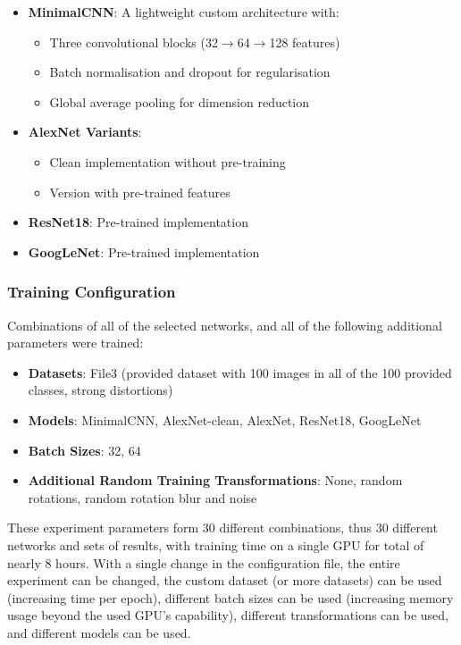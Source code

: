 \documentclass[conference]{IEEEtran}
\begin{document}
\begin{itemize}
    \item \textbf{MinimalCNN}: A lightweight custom architecture with:
    \begin{itemize}
        \item Three convolutional blocks (32$\rightarrow$64$\rightarrow$128 features)
        \item Batch normalisation and dropout for regularisation
        \item Global average pooling for dimension reduction
    \end{itemize}
    
    \item \textbf{AlexNet Variants}:
    \begin{itemize}
        \item Clean implementation without pre-training
        \item Version with pre-trained features
    \end{itemize}
    
    \item \textbf{ResNet18}: Pre-trained implementation
    \item \textbf{GoogLeNet}: Pre-trained implementation
\end{itemize}

\subsubsection{Training Configuration}

Combinations of all of the selected networks, and all of the following additional parameters were trained:

\begin{itemize}
  \item \textbf{Datasets}: File3 (provided dataset with 100 images in all of the 100 provided classes, strong distortions)
  \item \textbf{Models}: MinimalCNN, AlexNet-clean, AlexNet, ResNet18, GoogLeNet
  \item \textbf{Batch Sizes}: 32, 64
  \item \textbf{Additional Random Training Transformations}: None, random rotations, random rotation blur and noise
\end{itemize}

These experiment parameters form 30 different combinations, thus 30 different networks and sets of results, with training time on a single GPU for total of nearly 8 hours. 
With a single change in the configuration file, the entire experiment can be changed, the custom dataset (or more datasets) can be used (increasing time per epoch), different
batch sizes can be used (increasing memory usage beyond the used GPU's capability), different transformations can be used, and different models can be used.
\end{document}
